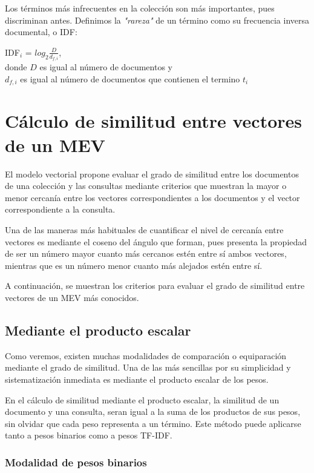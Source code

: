 \documentclass{article}
\begin{document}
Los términos más infrecuentes en la colección son más importantes, pues discriminan antes. Definimos la \textit{"rareza"} de un término como su frecuencia inversa documental, o IDF:

\begin{center}
	IDF$_{i}$ = $log_{2} \frac{D}{d_{f, i}}$, \\
	donde $D$ es igual al número de documentos y \\ 
	$d_{f, i}$ es igual al número de documentos que contienen el termino $t_{i}$
\end{center}

\section{Cálculo de similitud entre vectores de un MEV}

El modelo vectorial propone evaluar el grado de similitud entre los documentos de una colección y las consultas mediante criterios que muestran la mayor o menor cercanía entre los vectores correspondientes a los documentos y el vector correspondiente a la consulta. 

Una de las maneras más habituales de cuantificar el nivel de cercanía entre vectores es mediante el coseno del ángulo que forman, pues presenta la propiedad de ser un número mayor cuanto más cercanos estén entre sí ambos vectores, mientras que es un número menor cuanto más alejados estén entre sí.

A continuación, se muestran los criterios para evaluar el grado de similitud entre vectores de un MEV más conocidos.

\subsection{Mediante el producto escalar}

Como veremos, existen muchas modalidades de comparación o equiparación mediante el grado de similitud. Una de las más sencillas por su simplicidad y sistematización inmediata es mediante el producto escalar de los pesos.

En el cálculo de similitud mediante el producto escalar, la similitud de un documento y una consulta, seran igual a la suma de los productos de sus pesos, sin olvidar que cada peso representa a un término. Este método puede aplicarse tanto a pesos binarios como a pesos TF-IDF.

\subsubsection{Modalidad de pesos binarios}
\end{document}
